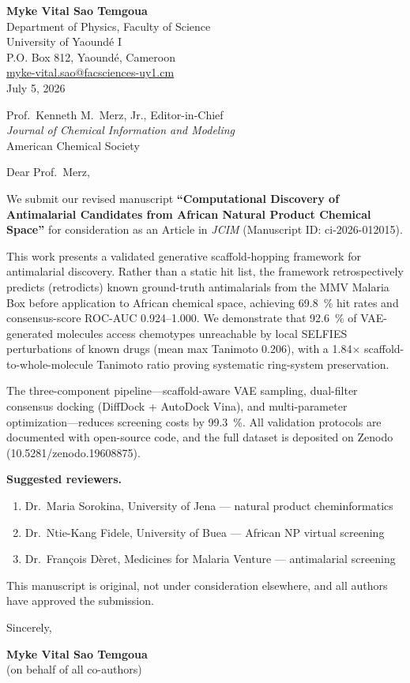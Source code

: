 \documentclass[11pt,letterpaper]{article}
\begin{document}
\begin{flushleft}
\textbf{Myke Vital Sao Temgoua} \\
Department of Physics, Faculty of Science \\
University of Yaound\'{e} I \\
P.O. Box 812, Yaound\'{e}, Cameroon \\
\href{mailto:myke-vital.sao@facsciences-uy1.cm}{myke-vital.sao@facsciences-uy1.cm} \\[1.5em]
July 5, 2026
\end{flushleft}

\begin{flushleft}
Prof.\ Kenneth M.\ Merz, Jr., Editor-in-Chief \\
\textit{Journal of Chemical Information and Modeling} \\
American Chemical Society
\end{flushleft}

\vspace{0.5em}

\noindent Dear Prof.\ Merz,

We submit our revised manuscript \textbf{``Computational Discovery of Antimalarial Candidates from African Natural Product Chemical Space''} for consideration as an Article in \textit{JCIM} (Manuscript ID: ci-2026-012015).

This work presents a validated generative scaffold-hopping framework for antimalarial discovery. Rather than a static hit list, the framework retrospectively predicts (retrodicts) known ground-truth antimalarials from the MMV Malaria Box before application to African chemical space, achieving \qty{69.8}{\percent} hit rates and consensus-score ROC-AUC \numrange{0.924}{1.000}. We demonstrate that \qty{92.6}{\percent} of VAE-generated molecules access chemotypes unreachable by local SELFIES perturbations of known drugs (mean max Tanimoto \num{0.206}), with a \num{1.84}$\times$ scaffold-to-whole-molecule Tanimoto ratio proving systematic ring-system preservation.

The three-component pipeline---scaffold-aware VAE sampling, dual-filter consensus docking (DiffDock + AutoDock Vina), and multi-parameter optimization---reduces screening costs by \qty{99.3}{\percent}. All validation protocols are documented with open-source code, and the full dataset is deposited on Zenodo (10.5281/zenodo.19608875).

\noindent\textbf{Suggested reviewers.}
\begin{enumerate}
  \item Dr.\ Maria Sorokina, University of Jena --- natural product cheminformatics
  \item Dr.\ Ntie-Kang Fidele, University of Buea --- African NP virtual screening
  \item Dr.\ Fran\c{c}ois D\`{e}ret, Medicines for Malaria Venture --- antimalarial screening
\end{enumerate}

\noindent This manuscript is original, not under consideration elsewhere, and all authors have approved the submission.

\vspace{1em}

\noindent Sincerely,

\vspace{1em}

\noindent \textbf{Myke Vital Sao Temgoua} \\
(on behalf of all co-authors)
\end{document}
